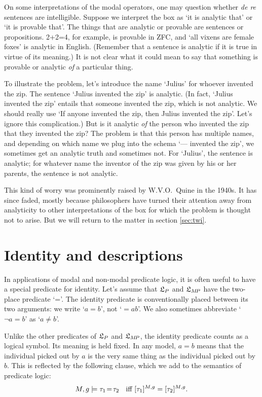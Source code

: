 On some interpretations of the modal operators, one may question whether
\emph{de re} sentences are intelligible. Suppose we interpret the box as `it is
analytic that' or `it is provable that'. The things that are analytic or
provable are sentences or propositions. 2+2=4, for example, is provable in
ZFC, and `all vixens are female foxes' is analytic in English. (Remember that a
sentence is analytic if it is true in virtue of its meaning.) It is not clear
what it could mean to say that something is provable or analytic \emph{of} a
particular thing.

To illustrate the problem, let's introduce the name `Julius' for whoever
invented the zip. The sentence `Julius invented the zip' is analytic. (In fact,
`Julius invented the zip' entails that someone invented the zip, which is not
analytic. We should really use `If anyone invented the zip, then Julius invented
the zip'. Let's ignore this complication.) But is it analytic \emph{of} the
person who invented the zip that they invented the zip? The problem is that this
person has multiple names, and depending on which name we plug into the schema
`--- invented the zip', we sometimes get an analytic truth and sometimes not.
For `Julius', the sentence is analytic; for whatever name the inventor of the
zip was given by his or her parents, the sentence is not analytic.

This kind of worry was prominently raised by W.V.O.\ Quine in the 1940s.  It has
since faded, mostly because philosophers have turned their attention away from
analyticity to other interpretations of the box for which the problem is thought
not to arise. But we will return to the matter in section \ref{sec:twi}.


\section{Identity and descriptions}
\label{sec:identity}

In applications of modal and non-modal predicate logic, it is often useful to
have a special predicate for identity. Let's assume that $\mathfrak{L}_P$ and $\mathfrak{L}_{M\!P}$
have the two-place predicate `='. The identity predicate is conventionally
placed between its two arguments: we write `$a=b$', not `$=\!ab$'. We also sometimes abbreviate `$\neg a\!=\!b$' as `$a\not=b$'. 

Unlike the other predicates of $\mathfrak{L}_P$ and $\mathfrak{L}_{M\!P}$, the identity predicate
counts as a logical symbol. Its meaning is held fixed. In any model, $a=b$
means that the individual picked out by $a$ is the very same thing as the
individual picked out by $b$. This is reflected by the following clause, which
we add to the semantics of predicate logic:
\[
  M,g \models \tau_1\!=\!\tau_2\text{ \; iff }[\tau_1]^{M,g} = [\tau_2]^{M,g}.
\]

